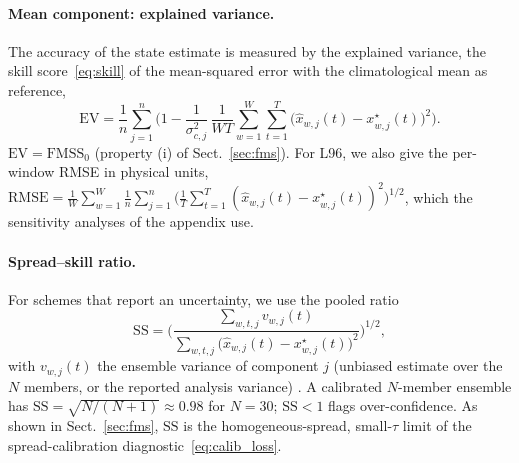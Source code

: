 \paragraph{Mean component: explained variance.}
The accuracy of the state estimate is measured by the explained variance, the
skill score~\eqref{eq:skill} of the mean-squared error with the climatological mean
as reference,
\begin{equation}\label{eq:ev}
  \mathrm{EV} = \frac{1}{n}\sum_{j=1}^{n}
  \Big(1 - \frac{1}{\sigma_{c,j}^2}\,\frac{1}{WT}\sum_{w=1}^{W}\sum_{t=1}^{T}
  \big(\hat x_{w,j}(t) - x^\star_{w,j}(t)\big)^2\Big).
\end{equation}
$\mathrm{EV} = \mathrm{FMSS}_0$ (property (i) of Sect.~\ref{sec:fms}). For L96, we also
give the per-window RMSE in physical units,
$\mathrm{RMSE} = \frac{1}{W}\sum_{w=1}^{W}\frac{1}{n}\sum_{j=1}^{n}
\big(\frac{1}{T}\sum_{t=1}^{T} (\hat x_{w,j}(t) - x^\star_{w,j}(t))^2\big)^{1/2}$,
which the sensitivity analyses of the appendix use.

\paragraph{Spread--skill ratio.}
For schemes that report an uncertainty, we use the pooled ratio
\begin{equation}\label{eq:ss}
  \mathrm{SS} = \bigg(\frac{\sum_{w,t,j} v_{w,j}(t)}
  {\sum_{w,t,j} \big(\hat x_{w,j}(t) - x^\star_{w,j}(t)\big)^2}\bigg)^{1/2},
\end{equation}
with $v_{w,j}(t)$ the ensemble variance of component $j$ (unbiased estimate over the $N$
members, or the reported analysis variance)
\cite{leutbecher_ensemble_2008,fortin_why_2014}. A calibrated $N$-member ensemble has
$\mathrm{SS} = \sqrt{N/(N+1)} \approx 0.98$ for $N = 30$; $\mathrm{SS} < 1$ flags
over-confidence. As shown in Sect.~\ref{sec:fms}, $\mathrm{SS}$ is the
homogeneous-spread, small-$\tau$ limit of the spread-calibration
diagnostic~\eqref{eq:calib_loss}.

